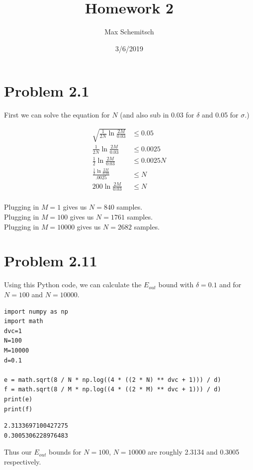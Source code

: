 \documentclass[a4paper]{article}
\title{Homework 2}
\author{Max Schemitsch}
\date{3/6/2019}
\begin{document}
\lstset{language=Python}

\maketitle

\section{Problem 2.1}
First we can solve the equation for $N$ (and also sub in 0.03 for $\delta$ and 0.05 for $\sigma$.)

\begin{equation}
    \begin{aligned}
\sqrt{\frac{1}{2N}\ln\frac{2M}{0.03}} &\leq 0.05 \\
\frac{1}{2N}\ln\frac{2M}{0.03} &\leq 0.0025 \\
\frac{1}{2}\ln\frac{2M}{0.03} &\leq 0.0025N \\
\frac{\frac{1}{2}\ln\frac{2M}{0.03}}{.0025} &\leq N \\
200 \ln\frac{2M}{0.03} &\leq N \\
    \end{aligned}
\end{equation}

Plugging in $M=1$ gives us $N=840$ samples. \\
Plugging in $M=100$ gives us $N=1761$ samples. \\
Plugging in $M=10000$ gives us $N=2682$ samples. \\

\section{Problem 2.11}
Using this Python code, we can calculate the $E_{out}$ bound with $\delta=0.1$ and for $N=100$ and $N=10000$.

\begin{lstlisting}[frame=single]
import numpy as np
import math
dvc=1
N=100
M=10000
d=0.1

e = math.sqrt(8 / N * np.log((4 * ((2 * N) ** dvc + 1))) / d)
f = math.sqrt(8 / M * np.log((4 * ((2 * M) ** dvc + 1))) / d)
print(e)
print(f)
\end{lstlisting}

\begin{lstlisting}
2.3133697100427275
0.3005306228976483
\end{lstlisting}
Thus our $E_{out}$ bounds for $N=100$, $N=10000$ are roughly 2.3134 and 0.3005 respectively.
\end{document}
